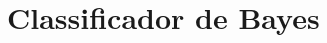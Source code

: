 \documentclass[ 
	article,			%
	11pt,				%
	oneside,			%
	a4paper,			%
	english,			%
	brazil,				%
	]{abntex2}
\begin{document}
% 
% 
% 
% 
%  
%  


\section{Classificador de Bayes}
\end{document}
